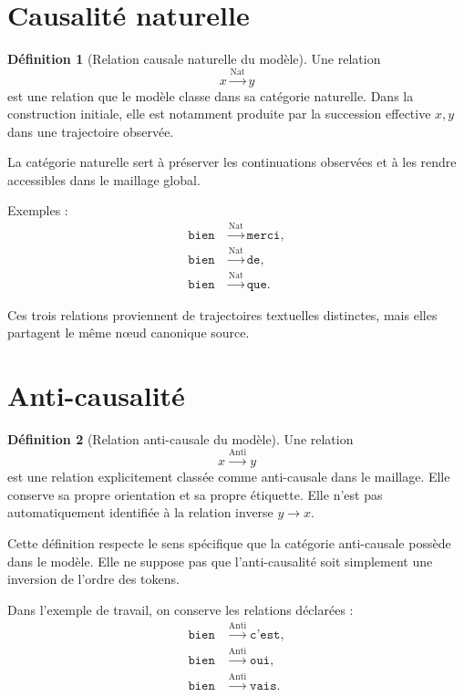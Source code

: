 \documentclass[11pt,a4paper]{report}
\theoremstyle{definition}
\newtheorem{definition}{Définition}[chapter]
\theoremstyle{plain}
\theoremstyle{remark}
\begin{document}
\section{Causalité naturelle}

\begin{definition}[Relation causale naturelle du modèle]
Une relation
\[
x\overset{\mathrm{Nat}}{\longrightarrow}y
\]
est une relation que le modèle classe dans sa catégorie
naturelle. Dans la construction initiale, elle est notamment
produite par la succession effective \(x,y\) dans une trajectoire
observée.
\end{definition}

La catégorie naturelle sert à préserver les continuations
observées et à les rendre accessibles dans le maillage global.

Exemples :
\[
\begin{aligned}
\texttt{bien}&\overset{\mathrm{Nat}}{\longrightarrow}\texttt{merci},\\
\texttt{bien}&\overset{\mathrm{Nat}}{\longrightarrow}\texttt{de},\\
\texttt{bien}&\overset{\mathrm{Nat}}{\longrightarrow}\texttt{que}.
\end{aligned}
\]

Ces trois relations proviennent de trajectoires textuelles
distinctes, mais elles partagent le même nœud canonique source.

\section{Anti-causalité}

\begin{definition}[Relation anti-causale du modèle]
Une relation
\[
x\overset{\mathrm{Anti}}{\longrightarrow}y
\]
est une relation explicitement classée comme anti-causale dans
le maillage. Elle conserve sa propre orientation et sa propre
étiquette. Elle n'est pas automatiquement identifiée à la
relation inverse \(y\to x\).
\end{definition}

Cette définition respecte le sens spécifique que la catégorie
anti-causale possède dans le modèle. Elle ne suppose pas que
l'anti-causalité soit simplement une inversion de l'ordre des
tokens.

Dans l'exemple de travail, on conserve les relations déclarées :
\[
\begin{aligned}
\texttt{bien}&\overset{\mathrm{Anti}}{\longrightarrow}\texttt{c'est},\\
\texttt{bien}&\overset{\mathrm{Anti}}{\longrightarrow}\texttt{oui},\\
\texttt{bien}&\overset{\mathrm{Anti}}{\longrightarrow}\texttt{vais}.
\end{aligned}
\]
\end{document}
